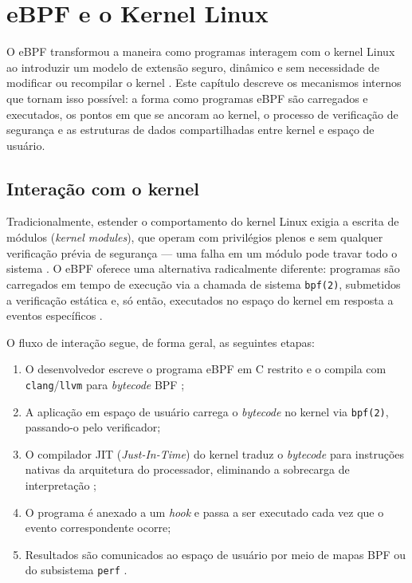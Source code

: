 \chapter{eBPF e o Kernel Linux}
\label{cap:kernel-seguranca}

O eBPF transformou a maneira como programas interagem com o kernel Linux ao
introduzir um modelo de extensão seguro, dinâmico e sem necessidade de modificar
ou recompilar o kernel \cite{linuxkernel2024}.
Este capítulo descreve os mecanismos internos que tornam isso possível: a forma
como programas eBPF são carregados e executados, os pontos em que se ancoram ao
kernel, o processo de verificação de segurança e as estruturas de dados compartilhadas
entre kernel e espaço de usuário.

\section{Interação com o kernel}

Tradicionalmente, estender o comportamento do kernel Linux exigia a escrita de
módulos (\textit{kernel modules}), que operam com privilégios plenos e sem
qualquer verificação prévia de segurança — uma falha em um módulo pode travar
todo o sistema \cite{gregg2020}.
O eBPF oferece uma alternativa radicalmente diferente: programas são carregados
em tempo de execução via a chamada de sistema \texttt{bpf(2)}, submetidos a
verificação estática e, só então, executados no espaço do kernel em resposta
a eventos específicos \cite{linuxkernel2024}.

O fluxo de interação segue, de forma geral, as seguintes etapas:

\begin{enumerate}
  \item O desenvolvedor escreve o programa eBPF em C restrito e o compila com
        \texttt{clang}/\texttt{llvm} para \textit{bytecode} BPF
        \cite{nakryiko2020};
  \item A aplicação em espaço de usuário carrega o \textit{bytecode} no kernel
        via \texttt{bpf(2)}, passando-o pelo verificador;
  \item O compilador JIT (\textit{Just-In-Time}) do kernel traduz o
        \textit{bytecode} para instruções nativas da arquitetura do processador,
        eliminando a sobrecarga de interpretação \cite{linuxkernel2024};
  \item O programa é anexado a um \textit{hook} e passa a ser executado cada vez
        que o evento correspondente ocorre;
  \item Resultados são comunicados ao espaço de usuário por meio de mapas BPF
        ou do subsistema \texttt{perf} \cite{gregg2019}.
\end{enumerate}

